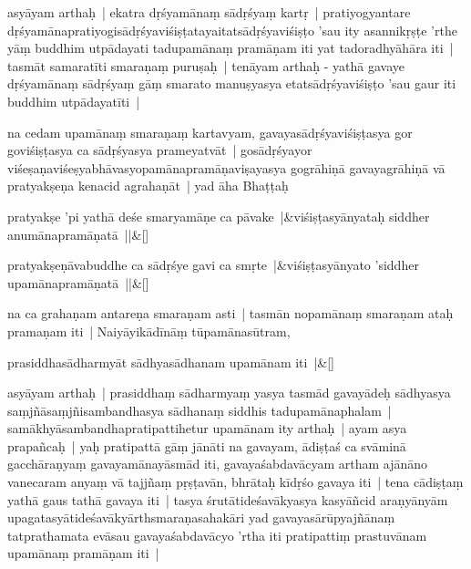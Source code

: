\documentclass[article,12pt,a4paper]{memoir}%
\newcounter{parCount}
\begin{document}
	  \pstart \leavevmode%
	\label{thakur75-98.5}asyāyam arthaḥ | ekatra dṛśyamānaṃ sādṛśyaṃ kartṛ | pratiyogyantare dṛśyamānapratiyogisādṛśyaviśiṣṭatayaitatsādṛśyaviśiṣṭo 'sau ity asannikṛṣṭe 'rthe yāṃ buddhim utpādayati tadupamānaṃ pramāṇam iti yat tadoradhyāhāra iti |\label{kāśikā1_end} tasmāt samaratīti smaraṇaṃ puruṣaḥ | tenāyam arthaḥ - yathā gavaye dṛśyamānaṃ sādṛśyaṃ gāṃ smarato manuṣyasya etatsādṛśyaviśiṣṭo 'sau gaur iti buddhim utpādayatīti |
	{}
	\pend%
      

	  \pstart \leavevmode%
	\label{thakur75-98.10}na cedam upamānaṃ smaraṇaṃ kartavyam, gavayasādṛśyaviśiṣṭasya gor goviśiṣṭasya ca sādṛśyasya prameyatvāt | gosādṛśyayor viśeṣaṇaviśeṣyabhāvasyopamānapramāṇaviṣayasya gogrāhiṇā gavayagrāhiṇā vā pratyakṣeṇa kenacid agrahaṇāt | yad āha Bhaṭṭaḥ
	{}
	\pend%
      
	    
	    \stanza[\smallbreak]
	  pratyakṣe 'pi yathā deśe smaryamāṇe ca pāvake |&viśiṣṭasyānyataḥ siddher anumānapramāṇatā ||\&[\smallbreak]
	  
	  
	  
	    
	    \stanza[\smallbreak]
	  pratyakṣeṇāvabuddhe ca sādṛśye gavi ca smṛte |&viśiṣṭasyānyato 'siddher upamānapramāṇatā ||\&[\smallbreak]
	  
	  
	  

	  \pstart \leavevmode%
	\label{thakur75-98.17}na ca grahaṇam antareṇa smaraṇam asti | tasmān nopamānaṃ smaraṇam ataḥ pramaṇam iti | Naiyāyikādīnāṃ tūpamānasūtram,
	{}
	\pend%
      
	    
	    \stanza[\smallbreak]
	  prasiddhasādharmyāt sādhyasādhanam upamānam iti |\&[\smallbreak]
	  
	  
	  

	  \pstart \leavevmode%
	\label{thakur75-98.20}asyāyam arthaḥ | prasiddhaṃ sādharmyaṃ yasya tasmād gavayādeḥ sādhyasya saṃjñāsaṃjñisambandhasya sādhanaṃ siddhis tadupamānaphalam | samākhyāsambandhapratipattihetur upamānam ity arthaḥ | ayam asya prapañcaḥ | yaḥ pratipattā gāṃ jānāti na gavayam, ādiṣṭaś ca svāminā gacchāraṇyaṃ gavayamānayāsmād iti, gavayaśabdavācyam artham ajānāno vanecaram anyaṃ vā tajjñaṃ pṛṣṭavān, bhrātaḥ kīdṛśo gavaya iti | tena cādiṣṭaṃ yathā gaus tathā gavaya iti | tasya śrutātideśavākyasya kasyāñcid araṇyānyām upagatasyātideśavākyārthsmaraṇasahakāri yad gavayasārūpyajñānaṃ tatprathamata evāsau gavayaśabdavācyo 'rtha iti pratipattiṃ prastuvānam upamānaṃ pramāṇam iti |
	{}
	\pend%
      
\end{document}
